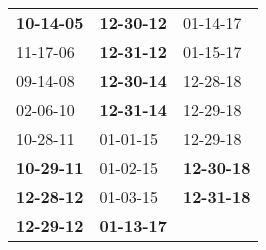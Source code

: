 \begin{supertabular}{p{0.33\columnwidth}p{0.33\columnwidth}p{0.33\columnwidth}}
 \textbf{10-14-05\textsuperscript{}} &  \textbf{12-30-12\textsuperscript{}} &           01-14-17\textsuperscript{} \\
          11-17-06\textsuperscript{} &  \textbf{12-31-12\textsuperscript{}} &           01-15-17\textsuperscript{} \\
          09-14-08\textsuperscript{} &  \textbf{12-30-14\textsuperscript{}} &           12-28-18\textsuperscript{} \\
          02-06-10\textsuperscript{} &  \textbf{12-31-14\textsuperscript{}} &           12-29-18\textsuperscript{} \\
          10-28-11\textsuperscript{} &           01-01-15\textsuperscript{} &           12-29-18\textsuperscript{} \\
 \textbf{10-29-11\textsuperscript{}} &           01-02-15\textsuperscript{} &  \textbf{12-30-18\textsuperscript{}} \\
 \textbf{12-28-12\textsuperscript{}} &           01-03-15\textsuperscript{} &  \textbf{12-31-18\textsuperscript{}} \\
 \textbf{12-29-12\textsuperscript{}} &  \textbf{01-13-17\textsuperscript{}} &                                      \\
\end{supertabular}
